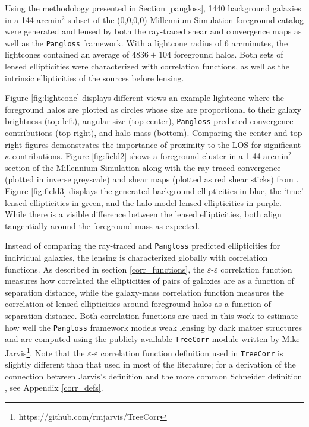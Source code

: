 \documentclass[%
 reprint,
 amsmath,amssymb,
 aps,nofootinbib
]{revtex4-1}
\begin{document}
Using the methodology presented in Section \ref{pangloss}, 1440 background galaxies in a 144 arcmin$^2$ subset of the (0,0,0,0) Millennium Simulation foreground catalog were generated and lensed by both the ray-traced shear and convergence maps as well as the \texttt{Pangloss} framework. With a lightcone radius of 6 arcminutes, the lightcones contained an average of ${4836\pm104}$ foreground halos. Both sets of lensed ellipticities were characterized with correlation functions, as well as the intrinsic ellipticities of the sources before lensing.

Figure \ref{fig:lightcone} displays different views an example lightcone where the foreground halos are plotted as circles whose size are proportional to their galaxy brightness (top left), angular size (top center), \texttt{Pangloss} predicted convergence contributions (top right), and halo mass (bottom). Comparing the center and top right figures demonstrates the importance of proximity to the LOS for significant $\kappa$ contributions. Figure \ref{fig:field2} shows a foreground cluster in a 1.44 arcmin$^2$ section of the Millennium Simulation along with the ray-traced convergence (plotted in inverse greyscale) and shear maps (plotted as red shear sticks) from \cite{ray_tracing}. Figure \ref{fig:field3} displays the generated background ellipticities in blue, the `true' lensed ellipticities in green, and the halo model lensed ellipticities in purple. While there is a visible difference between the lensed ellipticities, both align tangentially around the foreground mass as expected.

Instead of comparing the ray-traced and \texttt{Pangloss} predicted ellipticities for individual galaxies, the lensing is characterized globally with correlation functions. As described in section \ref{corr_functions}, the $\varepsilon$-$\varepsilon$ correlation function measures how correlated the ellipticities of pairs of galaxies are as a function of separation distance, while the galaxy-mass correlation function measures the correlation of lensed ellipticities around foreground halos as a function of separation distance. Both correlation functions are used in this work to estimate how well the \texttt{Pangloss} framework models weak lensing by dark matter structures and are computed using the publicly available \texttt{TreeCorr} module written by Mike Jarvis\footnote{https://github.com/rmjarvis/TreeCorr}. Note that the $\varepsilon$-$\varepsilon$ correlation function definition used in \texttt{TreeCorr} is slightly different than that used in most of the literature; for a derivation of the connection between Jarvis's definition \cite{jarvis} and the more common Schneider definition \cite{schneider}, see Appendix \ref{corr_defs}.
\end{document}
